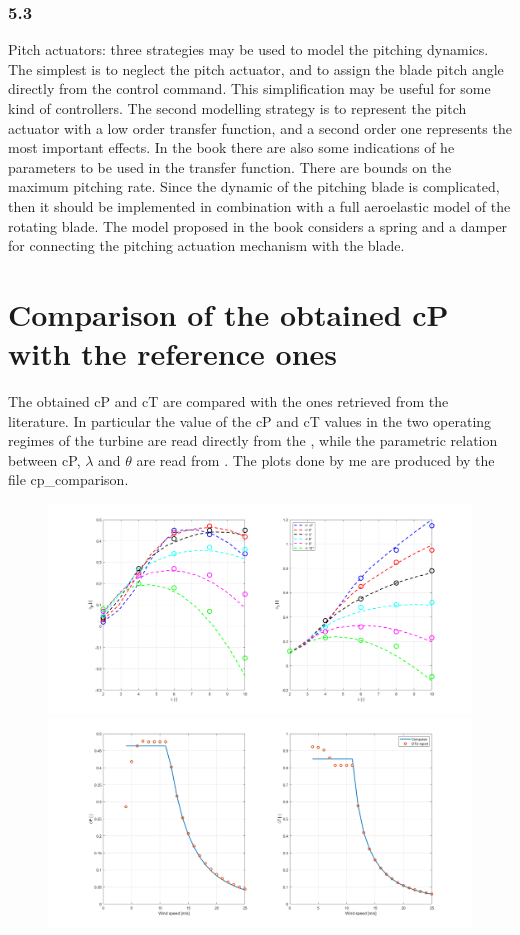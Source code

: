 \documentclass[]{article}
\begin{document}
\subsubsection{5.3}
Pitch actuators: three strategies may be used to model the pitching dynamics. The simplest is to neglect the pitch actuator, and to assign the blade pitch angle directly from the control command. This simplification may be useful for some kind of controllers. The second modelling strategy is to represent the pitch actuator with a low order transfer function, and a second order one represents the most important effects. In the book there are also some indications of he parameters to be used in the transfer function. There are bounds on the maximum pitching rate. Since the dynamic of the pitching blade is complicated, then it should be implemented in combination with a full aeroelastic model of the rotating blade. The model proposed in the book considers a spring and a damper for connecting the pitching actuation mechanism with the blade.

\section{Comparison of the obtained cP with the reference ones}
The obtained cP and cT are compared with the ones retrieved from the literature. In particular the value of the cP and cT values in the two operating regimes of the turbine are read directly from the \cite{DTU_Wind_Energy_Report-I-0092}, while the parametric relation between cP, $\lambda$ and $\theta$ are read from \cite{Variable-speed_Variable-pitch_control_for_a_wind_t}. The plots done by me are produced by the file cp\_comparison. 
\begin{figure}[H]
	\centering
	\includegraphics[width=0.7\linewidth]{images/cp_parametric_comp.png}
	\includegraphics[width=0.7\linewidth]{images/cp_DTU10MW_comp.png}
	\caption{}
	\label{fig:cpparametriccomp}
\end{figure}
\end{document}
